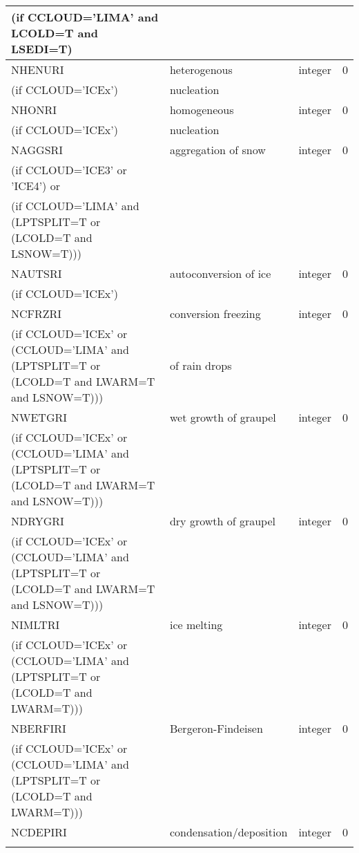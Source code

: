 \begin{longtable} {|p{}|p{}|>{\centering}p{}|p{}<{\centering}|}
(if CCLOUD='LIMA' and LCOLD=T and LSEDI=T) & &   &  \\\hline
NHENURI  & heterogenous   & integer  &  0 \index{NHENURI!\innam{NAM\_BU\_RRI}}\\ \nopagebreak
(if CCLOUD='ICEx') &nucleation &   &  \\\hline
NHONRI  & homogeneous   & integer  &  0 \index{NHONRI!\innam{NAM\_BU\_RRI}}\\ \nopagebreak
(if CCLOUD='ICEx') &nucleation &   &  \\\hline
NAGGSRI & aggregation of snow & integer  &  0 \index{NAGGSRI!\innam{NAM\_BU\_RRI}}\\ \nopagebreak
(if CCLOUD='ICE3' or 'ICE4') or & &   &  \\ \nopagebreak
(if CCLOUD='LIMA' and (LPTSPLIT=T or (LCOLD=T and LSNOW=T))) & &   &  \\\hline
NAUTSRI & autoconversion of ice & integer  &  0 \index{NAUTSRI!\innam{NAM\_BU\_RRI}}\\ \nopagebreak
(if CCLOUD='ICEx') & &   &  \\\hline
NCFRZRI &   conversion freezing  & integer  &  0 \index{NCFRZRI!\innam{NAM\_BU\_RRI}}\\ \nopagebreak
(if CCLOUD='ICEx' or (CCLOUD='LIMA' and (LPTSPLIT=T or (LCOLD=T and LWARM=T and LSNOW=T))) & of rain drops & & \\\hline
NWETGRI &   wet growth of graupel & integer  &  0 \index{NWETGRI!\innam{NAM\_BU\_RRI}}\\ \nopagebreak
(if CCLOUD='ICEx' or (CCLOUD='LIMA' and (LPTSPLIT=T or (LCOLD=T and LWARM=T and LSNOW=T))) & & & \\\hline
NDRYGRI &   dry growth of graupel & integer  &  0 \index{NDRYGRI!\innam{NAM\_BU\_RRI}}\\ \nopagebreak
(if CCLOUD='ICEx' or (CCLOUD='LIMA' and (LPTSPLIT=T or (LCOLD=T and LWARM=T and LSNOW=T))) & & & \\\hline
NIMLTRI &   ice melting & integer  &  0 \index{NIMLRI!\innam{NAM\_BU\_RRI}}\\ \nopagebreak
(if CCLOUD='ICEx' or (CCLOUD='LIMA' and (LPTSPLIT=T or (LCOLD=T and LWARM=T))) & &   &  \\\hline
NBERFIRI&   Bergeron-Findeisen & integer  &  0 \index{NBERFIRI!\innam{NAM\_BU\_RRI}}\\ \nopagebreak
(if CCLOUD='ICEx' or (CCLOUD='LIMA' and (LPTSPLIT=T or (LCOLD=T and LWARM=T))) & &   &  \\\hline
NCDEPIRI&   condensation/deposition & integer  &  0 \index{NCDEPIRI!\innam{NAM\_BU\_RRI}}\\ \nopagebreak

\end{longtable}
